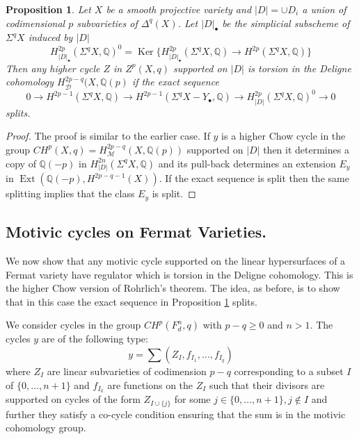 \documentclass[12pt,reqno]{article}
\newtheorem{prop}[defn]{Proposition}
\newcommand {\Q}{{\mathds Q}}
\newcommand {\M}{{\mathcal M}}
\newcommand {\D}{{\mathcal D}}
\def\Ker{\operatorname{Ker}}
\def\Ext{\operatorname{Ext}}
\begin{document}
	\begin{prop} Let $X$ be a smooth projective variety and $|D|=\cup D_i$ a union of codimensional $p$ subvarieties of $\Delta^q(X)$. Let $|D|_{\bullet}$ be the simplicial subscheme of $\Sigma^q X$ induced by $|D|$ 
	$$H^{2p}_{|D|_{\bullet}}(\Sigma^q X,\Q)^0= \Ker\{H^{2p}_{|D|_{\bullet}}(\Sigma^q X,\Q) \rightarrow H^{2p}(\Sigma^q X,\Q)\}$$
	Then any higher cycle  $Z$ in $Z^p(X,q)$ supported on $|D|$ is torsion in the Deligne cohomology $H^{2p-q}_{\D}(X,\Q(p)$  if the exact sequence 
	$$0 \rightarrow H^{2p-1}(\Sigma^q X,\Q) \rightarrow  H^{2p-1}(\Sigma^q X - Y_{\bullet},\Q) \rightarrow H^{2p}_{|D|}(\Sigma^q X,\Q)^0 \rightarrow 0$$
	splits.  
	
	\label{highersplitting} 
	
\end{prop}
\begin{proof} The proof is similar to the earlier case. If $y$ is a higher Chow cycle in the
	group $CH^p(X,q)=H^{2p-q}_{\M}(X,\Q(p))$ supported on $|D|$ then it determines a copy 
	 of $\Q(-p)$ in $H^{2n}_{|D|}(\Sigma^q X,\Q)$ and its pull-back determines an extension 
	 $E_y$ in $\Ext(\Q(-p),H^{2p-q-1}(X))$. If the exact sequence is split then the same 
	 splitting implies that the class $E_y$ is split. 
\end{proof}
  

\subsection{Motivic cycles on Fermat Varieties.}

We now show that any motivic cycle supported on the linear hypersurfaces of a Fermat variety have regulator which is torsion in the Deligne cohomology. This is the higher Chow version of Rohrlich's theorem. The idea, as before, is to show that in this case the exact sequence in Proposition \ref{highersplitting} splits. 

We consider cycles in the group $CH^p(F_d^n,q)$ with $p-q \geq 0$ and $n>1$. The cycles $y$ are of the following type:
%
$$y=\sum (Z_I,f_{I_1},\dots, f_{I_q})$$
%
where $Z_I$ are linear subvarieties of codimension $p-q$ corresponding to a subset $I$ of $\{0,\dots,n+1\}$ and $f_{I_k}$ are functions on the $Z_I$ such that their divisors are supported on cycles of the form $Z_{I\cup \{j\}}$ for some $j\in \{0, \dots,n+1\}, j \notin I$ and further they satisfy a co-cycle condition ensuring that the sum is in the motivic cohomology group. 
\end{document}
